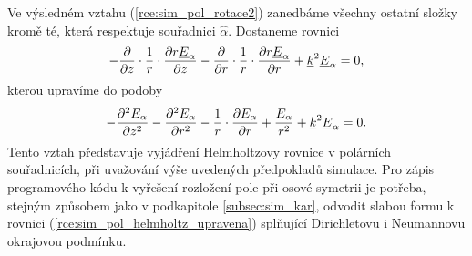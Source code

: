 Ve výsledném vztahu (\ref{rce:sim_pol_rotace2}) zanedbáme všechny ostatní složky kromě té, která respektuje souřadnici $\hat{\alpha}$. Dostaneme rovnici
\begin{displaymath}
-\frac{\partial}{\partial z}\cdot\frac{1}{r}\cdot\frac{\partial r{\underline{E}}_{\alpha}}{\partial z} - \frac{\partial}{\partial r}\cdot\frac{1}{r}\cdot\frac{\partial r{\underline{E}}_{\alpha}}{\partial r}+{\underline{k}}^{2}{\underline{E}}_{\alpha} = 0,
\end{displaymath}
kterou upravíme do podoby
\begin{equation}
-\frac{\partial^{2}E_{\alpha}}{\partial z^{2}}-\frac{\partial^{2}E_{\alpha}}{\partial r^{2}}-\frac{1}{r}\cdot\frac{\partial E_{\alpha}}{\partial r} + \frac{E_{\alpha}}{r^{2}} +{\underline{k}}^{2}{\underline{E}}_{\alpha} = 0.
	\label{rce:sim_pol_helmholtz_upravena}
\end{equation}
Tento vztah představuje vyjádření Helmholtzovy rovnice v polárních souřadnicích, při uvažování výše uvedených předpokladů simulace. Pro zápis programového kódu k vyřešení rozložení pole při osové symetrii je potřeba, stejným způsobem jako v podkapitole \ref{subsec:sim_kar}, odvodit slabou formu k rovnici (\ref{rce:sim_pol_helmholtz_upravena}) 
splňující Dirichletovu i Neumannovu okrajovou podmínku. 

